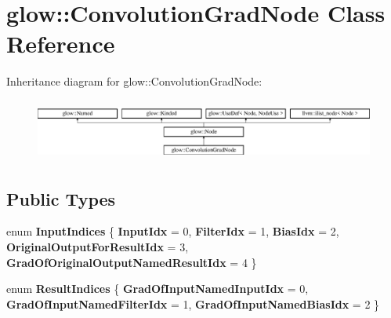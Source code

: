 \hypertarget{classglow_1_1_convolution_grad_node}{}\section{glow\+:\+:Convolution\+Grad\+Node Class Reference}
\label{classglow_1_1_convolution_grad_node}
Inheritance diagram for glow\+:\+:Convolution\+Grad\+Node\+:\begin{figure}[H]
\begin{center}
\leavevmode
\includegraphics[height=2.028986cm]{classglow_1_1_convolution_grad_node}
\end{center}
\end{figure}
\subsection*{Public Types}
\begin{DoxyCompactItemize}
\item 
\mbox{\label{classglow_1_1_convolution_grad_node_a5ebdc77f4d9240ffeb66e7507234a2c6}} 
enum {\bfseries Input\+Indices} \{ \newline
{\bfseries Input\+Idx} = 0, 
{\bfseries Filter\+Idx} = 1, 
{\bfseries Bias\+Idx} = 2, 
{\bfseries Original\+Output\+For\+Result\+Idx} = 3, 
\newline
{\bfseries Grad\+Of\+Original\+Output\+Named\+Result\+Idx} = 4
 \}
\item 
\mbox{\label{classglow_1_1_convolution_grad_node_a5a1f13ac8a4fb46d2759033f5ec78c79}} 
enum {\bfseries Result\+Indices} \{ {\bfseries Grad\+Of\+Input\+Named\+Input\+Idx} = 0, 
{\bfseries Grad\+Of\+Input\+Named\+Filter\+Idx} = 1, 
{\bfseries Grad\+Of\+Input\+Named\+Bias\+Idx} = 2
 \}
\end{DoxyCompactItemize}

